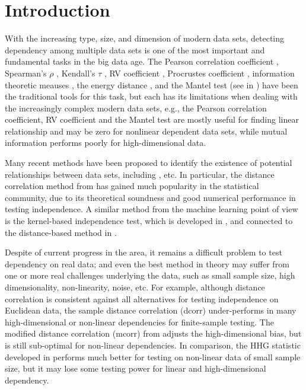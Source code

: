 \documentclass[12pt]{article}
\begin{document}
\section{Introduction}
With the increasing type, size, and dimension of modern data sets, detecting dependency among multiple data sets is one of the most important and fundamental tasks in the big data age. The Pearson correlation coefficient \cite{XXX}, Spearman's $\rho$ \cite{XXX}, Kendall's $\tau$ \cite{XXX},  RV coefficient \cite{XXX}, Procrustes coefficient \cite{XXX}, information theoretic meauses \cite{Renyi1959}, the energy distance \cite{XXX}, and the Mantel test (see in \cite{JosseHolmes2013, RobertEscoufier1976, Mantel1967}) have been the traditional tools for this task, but each has its limitations when dealing with the increasingly complex modern data sets, e.g., the Pearson correlation coefficient, RV coefficient and the Mantel test are mostly useful for finding linear relationship and may be zero for nonlinear dependent data sets, while mutual information performs poorly for high-dimensional data. 

Many recent methods have been proposed to identify the existence of potential relationships between data sets, including \cite{Baringhaus2004,TaskinenOjaRandles2005, GrettonEtAl2005, SzekelyRizzoBakirov2007, GrettonGyorfi2010,Reshef2011, HellerGorfine2013, Reimherr2013, SzekelyRizzo2013a}, etc. In particular, the distance correlation method from \cite{SzekelyRizzoBakirov2007}  has gained much popularity in the statistical community, due to its theoretical soundness and good numerical performance in testing independence. A similar method from the machine learning point of view is the kernel-based independence test, which is developed in \cite{GrettonEtAl2005, GrettonGyorfi2010, GrettonEtAl2012}, and connected to the distance-based method in \cite{SejdinovicEtAl2013}.

Despite of current progress in the area, it remains a difficult problem to test dependency on real data; and even the best method in theory may suffer from one or more real challenges underlying the data, such as small sample size, high dimensionality, non-linearity, noise, etc. For example, although distance correlation is consistent against all alternatives for testing independence on Euclidean data, the sample distance correlation (dcorr) under-performs in many high-dimensional or non-linear dependencies for finite-sample testing. The modified distance correlation (mcorr) from \cite{SzekelyRizzo2013a} adjusts the high-dimensional bias, but is still sub-optimal for non-linear dependencies. In comparison, the HHG statistic developed in \cite{HellerGorfine2013} performs much better for testing on non-linear data of small sample size, but it may lose some testing power for linear and high-dimensional dependency.
\end{document}
